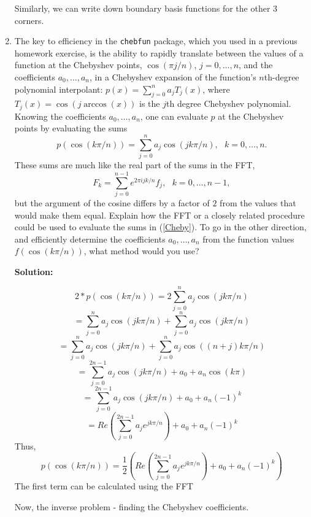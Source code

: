 \documentclass[letterpaper,12pt]{article}
\begin{document}
\begin{enumerate}
  Similarly, we can write down boundary basis functions for the other 3 corners.
\item

The key to efficiency in the \verb+chebfun+ package, which you used in a previous homework
exercise, is the ability to rapidly translate between the values of a function at the
Chebyshev points, $\cos ( \pi j/n )$, $j=0, \ldots , n$, and the coefficients $a_0 , \ldots , a_n$,
in a Chebyshev expansion of the function's $n$th-degree polynomial interpolant:
$p(x) = \sum_{j=0}^n a_j T_j (x)$, where $T_j (x) = \cos ( j \arccos (x) )$ is the $j$th
degree Chebyshev polynomial.  Knowing the coefficients $a_0 , \ldots , a_n$, one can evaluate
$p$ at the Chebyshev points by evaluating the sums
\begin{equation}
p ( \cos ( k \pi / n ) ) = \sum_{j=0}^n a_j \cos ( j k \pi / n ) ,~~~k=0, \ldots , n.
\label{Cheby}
\end{equation}
These sums are much like the real part of the sums in the FFT,
\[
F_k = \sum_{j=0}^{n-1} e^{2 \pi i j k / n} f_j ,~~~k=0, \ldots , n-1 ,
\]
but the argument of the cosine differs by a factor of $2$ from the values that would make
them equal.  Explain how the FFT or a closely related procedure could be used to evaluate
the sums in (\ref{Cheby}).  To go in the other direction, and efficiently determine the coefficients
$a_0 , \ldots , a_n$ from the function values $f( \cos ( k \pi / n ) )$, what method would you use?


{\bf Solution:}

\[2 * p ( \cos ( k \pi / n ) ) = 2 \sum_{j=0}^n a_j \cos ( j k \pi / n ) \]
\[= \sum_{j=0}^n a_j \cos ( j k \pi / n ) + \sum_{j=0}^n a_j \cos ( j k \pi / n ) \]
\[= \sum_{j=0}^n a_j \cos ( j k \pi / n ) + \sum_{j=0}^n a_j \cos ( (n+j) k \pi / n ) \]
\[= \sum_{j=0}^{2n-1} a_j \cos ( j k \pi / n ) + a_0 +a_n \cos ( k \pi ) \]
\[= \sum_{j=0}^{2n-1} a_j \cos ( j k \pi / n ) + a_0 +a_n (-1)^k \]
\[= Re(\sum_{j=0}^{2n-1} a_j e^{ j k \pi / n  }) + a_0 +a_n (-1)^k \]
Thus, 
\[ p ( \cos ( k \pi / n ) ) = \frac{1}{2} (Re(\sum_{j=0}^{2n-1} a_j e^{ j k \pi / n  }) + a_0 +a_n (-1)^k) \]
The first term can be calculated using the FFT

Now, the inverse problem - finding the Chebyshev coefficients.


\end{enumerate}
\end{document}
